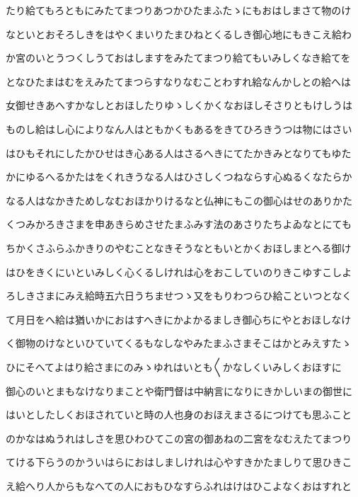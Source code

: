 \documentclass[a4paper,11pt,landscape]{ltjtarticle}
\begin{document}
\par\medskip
たり給てもろともにみたてまつりあつかひたまふたゝにもおはしまさて物のけ
\par\medskip
なといとおそろしきをはやくまいりたまひねとくるしき御心地にもきこえ給わ
\par\medskip
か宮のいとうつくしうておはしますをみたてまつり給てもいみしくなき給てを
\par\medskip
となひたまはむをえみたてまつらすなりなむことわすれ給なんかしとの給へは
\par\medskip
女御せきあへすかなしとおほしたりゆゝしくかくなおほしそさりともけしうは
\par\medskip
ものし給はし心によりなん人はともかくもあるをきてひろきうつは物にはさい
\par\medskip
はひもそれにしたかひせはき心ある人はさるへきにてたかきみとなりてもゆた
\par\medskip
かにゆるへるかたはをくれきうなる人はひさしくつねならす心ぬるくなたらか
\par\medskip
なる人はなかきためしなむおほかりけるなと仏神にもこの御心はせのありかた
\par\medskip
くつみかろきさまを申あきらめさせたまふみす法のあさりたちよゐなとにても
\par\medskip
ちかくさふらふかきりのやむことなきそうなともいとかくおほしまとへる御け
\par\medskip
はひをきくにいといみしく心くるしけれは心をおこしていのりきこゆすこしよ
\par\medskip
ろしきさまにみえ給時五六日うちませつゝ又をもりわつらひ給こといつとなく
\par\medskip
て月日をへ給は猶いかにおはすへきにかよかるましき御心ちにやとおほしなけ
\par\medskip
く御物のけなといひていてくるもなしなやみたまふさまそこはかとみえすたゝ
\par\medskip
ひにそへてよはり給さまにのみゝゆれはいとも〱かなしくいみしくおほすに
\par\medskip
御心のいとまもなけなりまことや衛門督は中納言になりにきかしいまの御世に
\par\medskip
はいとしたしくおほされていと時の人也身のおほえまさるにつけても思ふこと
\par\medskip
のかなはぬうれはしさを思ひわひてこの宮の御あねの二宮をなむえたてまつり
\par\medskip
てける下らうのかういはらにおはしましけれは心やすきかたましりて思ひきこ
\par\medskip
え給へり人からもなへての人におもひなすらふれはけはひこよなくおはすれと
\end{document}
